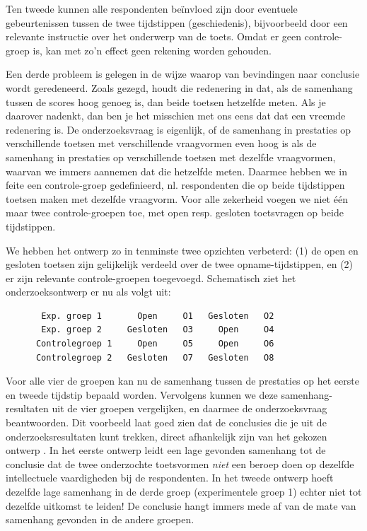 \documentclass[
]{book}
\begin{document}
Ten tweede kunnen alle respondenten beïnvloed zijn door eventuele
gebeurtenissen tussen de twee tijdstippen (geschiedenis), bijvoorbeeld
door een relevante instructie over het onderwerp van de toets. Omdat er
geen controle-groep is, kan met zo'n effect geen rekening worden
gehouden.

Een derde probleem is gelegen in de wijze waarop van bevindingen naar
conclusie wordt geredeneerd. Zoals gezegd, houdt die redenering in dat,
als de samenhang tussen de scores hoog genoeg is, dan beide toetsen
hetzelfde meten. Als je daarover nadenkt, dan ben je het misschien met
ons eens dat dat een vreemde redenering is. De onderzoeksvraag is
eigenlijk, of de samenhang in prestaties op verschillende toetsen met
verschillende vraagvormen even hoog is als de samenhang in prestaties op
verschillende toetsen met dezelfde vraagvormen, waarvan we immers
aannemen dat die hetzelfde meten. Daarmee hebben we in feite een
controle-groep gedefinieerd, nl. respondenten die op beide tijdstippen
toetsen maken met dezelfde vraagvorm. Voor alle zekerheid voegen we niet
één maar twee controle-groepen toe, met open resp. gesloten toetsvragen
op beide tijdstippen.

We hebben het ontwerp zo in tenminste twee opzichten verbeterd: (1) de open en gesloten
toetsen zijn gelijkelijk verdeeld over de twee opname-tijdstippen, en (2) er zijn
relevante controle-groepen toegevoegd. Schematisch ziet het
onderzoeksontwerp er nu als volgt uit:

\begin{verbatim}
       Exp. groep 1       Open     O1   Gesloten   O2
       Exp. groep 2     Gesloten   O3     Open     O4
      Controlegroep 1     Open     O5     Open     O6
      Controlegroep 2   Gesloten   O7   Gesloten   O8
\end{verbatim}

Voor alle vier de groepen kan nu de samenhang tussen de prestaties op
het eerste en tweede tijdstip bepaald worden. Vervolgens kunnen we deze
samenhang-resultaten uit de vier groepen vergelijken, en daarmee de
onderzoeksvraag beantwoorden. Dit voorbeeld laat goed zien dat de
conclusies die je uit de onderzoeksresultaten kunt trekken, direct
afhankelijk zijn van het gekozen ontwerp \citep{Levin99}. In het eerste
ontwerp leidt een lage gevonden samenhang tot de conclusie dat de twee
onderzochte toetsvormen \emph{niet} een beroep doen op dezelfde intellectuele
vaardigheden bij de respondenten. In het tweede ontwerp hoeft dezelfde
lage samenhang in de derde groep (experimentele groep 1) echter niet tot
dezelfde uitkomst te leiden! De conclusie hangt immers mede af van de
mate van samenhang gevonden in de andere groepen.
\end{document}
